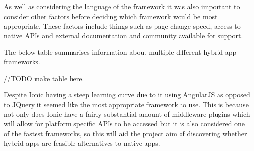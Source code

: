As well as considering the language of the framework it was also important to consider other factors before deciding which framework would be most appropriate. These factors include things such as page change speed, access to native APIs and external documentation and community available for support.

The below table summarises information about multiple different hybrid app frameworks.

//TODO make table here.

Despite Ionic having a steep learning curve due to it using AngularJS as opposed to JQuery it seemed like the most appropriate framework to use. This is because not only does Ionic have a fairly substantial amount of middleware plugins which will allow for platform specific APIs to be accessed but it is also considered one of the fastest frameworks, so this will aid the project aim of discovering whether hybrid apps are feasible alternatives to native apps. 

